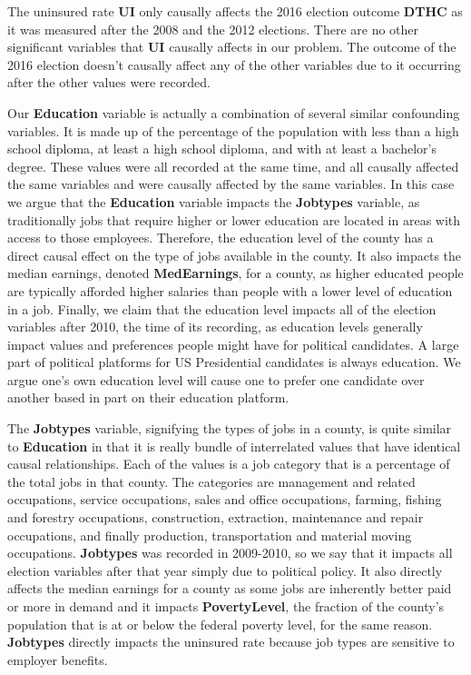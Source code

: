 \documentclass[11pt, conference,compsoc]{IEEEtran}
\begin{document}
The uninsured rate \textbf{UI} only causally affects the 2016 election outcome \textbf{DTHC} as it was measured after the 2008 and the 2012 elections. There are no other significant variables that \textbf{UI} causally affects in our problem. The outcome of the 2016 election doesn't causally affect any of the other variables due to it occurring after the other values were recorded.

Our \textbf{Education} variable is actually a combination of several similar confounding variables. It is made up of the percentage of the population with less than a high school diploma, at least a high school diploma, and with at least a bachelor’s degree. These values were all recorded at the same time, and all causally affected the same variables and were causally affected by the same variables. In this case we argue that the \textbf{Education} variable impacts the \textbf{Jobtypes} variable, as traditionally jobs that require higher or lower education are located in areas with access to those employees. Therefore, the education level of the county has a direct causal effect on the type of jobs available in the county. It also impacts the median earnings, denoted \textbf{MedEarnings}, for a county, as higher educated people are typically afforded higher salaries than people with a lower level of education in a job. Finally, we claim that the education level impacts all of the election variables after 2010, the time of its recording, as education levels generally impact values and preferences people might have for political candidates. A large part of political platforms for US Presidential candidates is always education. We argue one's own education level will cause one to prefer one candidate over another based in part on their education platform.

The \textbf{Jobtypes} variable, signifying the types of jobs in a county, is quite similar to \textbf{Education} in that it is really bundle of interrelated values that have identical causal relationships. Each of the values is a job category that is a percentage of the total jobs in that county. The categories are management and related occupations, service occupations, sales and office occupations, farming, fishing and forestry occupations, construction, extraction, maintenance and repair occupations, and finally production, transportation and material moving occupations. \textbf{Jobtypes} was recorded in 2009-2010, so we say that it impacts all election variables after that year simply due to political policy. It also directly affects the median earnings for a county as some jobs are inherently better paid or more in demand and it impacts \textbf{PovertyLevel}, the fraction of the county's population that is at or below the federal poverty level, for the same reason. \textbf{Jobtypes} directly impacts the uninsured rate because job types are sensitive to employer benefits.
\end{document}
